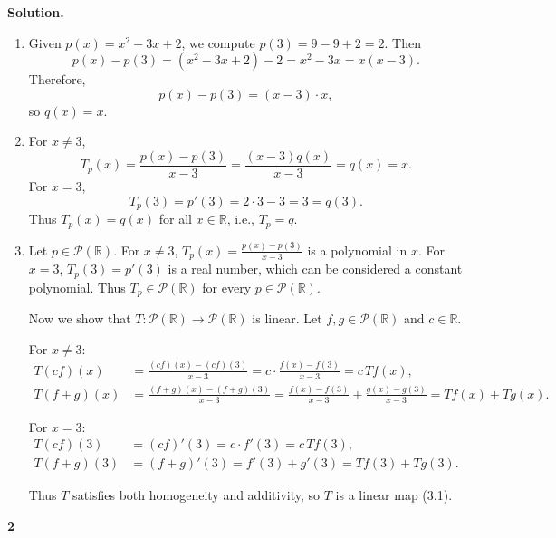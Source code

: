 \documentclass[11pt]{article}
\newcommand{\ProblemDivider}[1]{%
  \vspace{1.0em}
  \noindent\textbf{#1}\par
  \vspace{0.35em}
}
\newcommand{\SolutionAnnounce}{\noindent\textbf{Solution.}\par\medskip}
\newcommand{\R}{\mathbb{R}}
\newcommand{\Pcal}{\mathcal{P}}
\begin{document}
\begin{solutionBox}
\SolutionAnnounce
\doublespacing

\begin{enumerate}
  \item[(a)] Given \(p(x) = x^{2} - 3x + 2\), we compute \(p(3) = 9 - 9 + 2 = 2\). Then
  \[
  p(x) - p(3) = (x^{2} - 3x + 2) - 2 = x^{2} - 3x = x(x - 3).
  \]
  Therefore,
  \[
  p(x) - p(3) = (x - 3) \cdot x,
  \]
  so \(q(x) = x\).

  \item[(b)] For \(x \neq 3\),
  \[
  T_{p}(x) = \frac{p(x) - p(3)}{x-3} = \frac{(x-3)q(x)}{x-3} = q(x) = x.
  \]
  For \(x = 3\),
  \[
  T_{p}(3) = p'(3) = 2 \cdot 3 - 3 = 3 = q(3).
  \]
  Thus \(T_{p}(x) = q(x)\) for all \(x \in \R\), i.e., \(T_{p} = q\).

  \newpage

  \item[(c)] Let \(p \in \Pcal(\R)\). For \(x \neq 3\), \(T_{p}(x) = \frac{p(x) - p(3)}{x-3}\) is a polynomial in \(x\). For \(x = 3\), \(T_{p}(3) = p'(3)\) is a real number, which can be considered a constant polynomial. Thus \(T_{p} \in \Pcal(\R)\) for every \(p \in \Pcal(\R)\).

  Now we show that \(T : \Pcal(\R) \to \Pcal(\R)\) is linear. Let \(f, g \in \Pcal(\R)\) and \(c \in \R\).

  For \(x \neq 3\):
  \begin{align*}
  T(cf)(x) &= \frac{(cf)(x) - (cf)(3)}{x-3} = c \cdot \frac{f(x) - f(3)}{x-3} = c\, Tf(x), \\
  T(f+g)(x) &= \frac{(f+g)(x) - (f+g)(3)}{x-3} = \frac{f(x)-f(3)}{x-3} + \frac{g(x)-g(3)}{x-3} = Tf(x) + Tg(x).
  \end{align*}

  For \(x = 3\):
  \begin{align*}
  T(cf)(3) &= (cf)'(3) = c \cdot f'(3) = c\, Tf(3), \\
  T(f+g)(3) &= (f+g)'(3) = f'(3) + g'(3) = Tf(3) + Tg(3).
  \end{align*}

  Thus \(T\) satisfies both homogeneity and additivity, so \(T\) is a linear map (3.1).
\end{enumerate}

\end{solutionBox}

\ProblemDivider{2}
\end{document}
